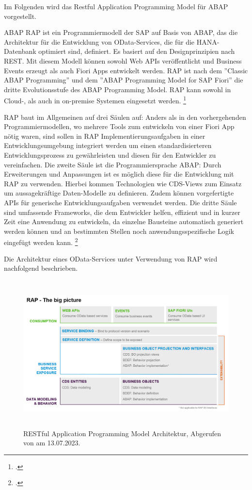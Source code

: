 Im Folgenden wird das Restful Application Programming Model für ABAP vorgestellt.

ABAP RAP ist ein Programmiermodell der SAP auf Basis von ABAP, das die Architektur für die Entwicklung von OData-Services, die für die HANA-Datenbank optimiert sind, definiert. Es basiert auf den Designprinzipien nach REST. Mit diesem Modell können sowohl Web APIs veröffentlicht und Business Events erzeugt als auch Fiori Apps entwickelt werden. RAP ist nach dem ''Classic ABAP Programming'' und dem ''ABAP Programming Model for SAP Fiori'' die dritte Evolutionsstufe des ABAP Programming Model.  RAP kann sowohl in Cloud-, als auch in on-premise Systemen eingesetzt werden. \footcite[Vgl.][]{sap_rap_2023}

RAP baut im Allgemeinen auf drei Säulen auf: Anders als in den vorhergehenden Programmiermodellen, wo mehrere Tools zum entwickeln von \zB einer Fiori App nötig waren, sind sollen in RAP Implementierungsaufgaben in einer Entwicklungsumgebung integriert werden um einen standardisierteren Entwicklungsprozess zu gewährleisten und diesen für den Entwickler zu vereinfachen. Die zweite Säule ist die Programmiersprache ABAP: Durch Erweiterungen und Anpassungen ist es möglich diese für die Entwicklung mit RAP zu verwenden. Hierbei kommen Technologien wie CDS-Views zum Einsatz um aussagekräftige Daten-Modelle zu definieren. Zudem können vorgefertigte APIs für generische Entwicklungsaufgaben verwendet werden. Die dritte Säule sind umfassende Frameworks, die dem Entwickler helfen, effizient und in kurzer Zeit eine Anwendung zu entwickeln, da einzelne Bausteine automatisch generiert werden können und an bestimmten Stellen noch anwendungsspezifische Logik eingefügt werden kann. \footcite[Vgl.][]{sap_rap_2023}

Die Architektur eines OData-Services unter Verwendung von RAP wird nachfolgend beschrieben.

\begin{figure}[h]
    \centering
    \includegraphics[height=8cm]{Bilder/RAP_Architektur.png}
    \caption[RESTful Application Programming Model Architektur]{RESTful Application Programming Model Architektur, Abgerufen von \cite{sap_rap_2023} am 13.07.2023.}
    \label{fig:iso_norm}
\end{figure}

